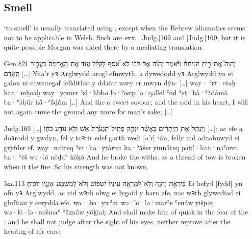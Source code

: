\subsection{Smell}


\begin{paper}
	 ‘to smell’ is usually translated using , except when the Hebrew idiomatics seems not to be applicable in Welsh. Such are exx.~\vref{Judg.}{16}{9}{} and \vref{Judg.}{16}{9}{}, but it is quite possible Morgan was aided there by a mediating translation.
\end{paper}

\begin{example}{Gen.}{8}{21}{}{}
	\quoling
	{ יְהוָה֮ אֶת־רֵ֣יחַ הַנִּיחֹחַ֒ וַיֹּ֨אמֶר יְהוָ֜ה אֶל־לִבּ֗וֹ לֹֽא־אֹ֠סִף לְקַלֵּ֨ל ע֤וֹד אֶת־הָֽאֲדָמָה֙ בַּעֲב֣וּר הָֽאָדָ֔ם […]}
	{Yna’r  yꝛ Arglwydd arogl eſmwyth, a dywedodd yꝛ Arglwydd yn ei galon ni chwanegaf felldithio y ddaiar mwy er mwyn dŷn: […]}
	{way· {\YHWH} ʾɛṯ·rēaḥ han·nīḥōaḥ way·yōmɛr {\YHWH} ʾɛl·libbō lō·ʾōsip̄ lə·qallēl ʿōḏ ʾɛṯ·hå̄·ʾăḏå̄må̄ ba·ʿăḇūr hå̄·ʾå̄ḏå̄m […]}
	{And the {\LORD}  a sweet savour; and the {\LORD} said in his heart, I will not again curse the ground any more for man’s sake; […]}
\end{example}

\begin{example}{Judg.}{16}{9}{}{}
	\quoling
	{[…] וַיְנַתֵּק֙ אֶת־הַיְתָרִ֔ים כַּאֲשֶׁ֨ר יִנָּתֵ֤ק פְּתִֽיל־הַנְּעֹ֙רֶת֙  אֵ֔שׁ וְלֹ֥א נוֹדַ֖ע כֹּחֽוֹ׃}
	{[…]: ac efe a doꝛrodd y gwdyn, fel y toꝛrir edef garth wedi  [a’r] tân, felly nid adnabuwyd ei gryfder ef.}
	{way·nattēq ʾɛṯ·ha·yṯå̄rīm ka·ʾăšɛr yinnå̄ṯēq pəṯīl·han·nəʿōrɛṯ ba· ʾēš wə·lō nōḏaʿ kōḥō}
	{And he brake the withs, as a thread of tow is broken when it  the fire. So his strength was not known.}
\end{example}

\begin{example}{Isa.}{11}{3}{}{}
	\quoling
	{ בְּיִרְאַ֣ת יְהוָ֑ה וְלֹֽא־לְמַרְאֵ֤ה עֵינָיו֙ יִשְׁפּ֔וֹט וְלֹֽא־לְמִשְׁמַ֥ע אָזְנָ֖יו יוֹכִֽיחַ׃}
	{Ei  hefyd [fydd] yn ofn yꝛ Arglwydd, ac nid wꝛth olwg ei lygaid y barn efe, nac wꝛth glywediad ei gluſtiau y cerydda efe.}
	{wa· bə·yirʾaṯ {\YHWH} wə·lō·lə·marʾē ʿēnå̄w yišpōṭ wə·lō·lə·mišmaʿ ʾå̄znå̄w yōḵīaḥ}
	{And shall make him of quick  in the fear of the {\LORD}: and he shall not judge after the sight of his eyes, neither reprove after the hearing of his ears:}
\end{example}



